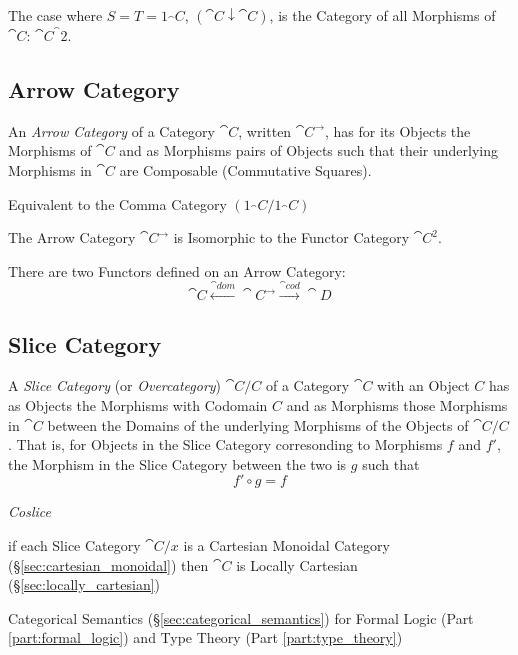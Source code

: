 The case where $S = T = 1_\cat{C}$, $(\cat{C} \downarrow
\cat{C})$, is the Category of all Morphisms of $\cat{C}$:
$\cat{C}^\cat{2}$.



\subsection{Arrow Category}\label{sec:arrow_category}

An \emph{Arrow Category} of a Category $\cat{C}$, written
$\cat{C^{\rightarrow}}$, has for its Objects the Morphisms of
$\cat{C}$ and as Morphisms pairs of Objects such that their
underlying Morphisms in $\cat{C}$ are Composable (Commutative
Squares).

Equivalent to the Comma Category $(1_\cat{C}/1_\cat{C})$

The Arrow Category $\cat{C}^\rightarrow$ is Isomorphic to the
Functor Category $\cat{C^2}$.

There are two Functors defined on an Arrow Category:
\[
  \cat{C} \xleftarrow{\cat{dom}} \cat{C}^\rightarrow
  \xrightarrow{\cat{cod}} \cat{D}
\]



\subsection{Slice Category}\label{sec:slice_category}

A \emph{Slice Category} (or \emph{Overcategory}) $\cat{C}/C$ of a Category
$\cat{C}$ with an Object $C$ has as Objects the Morphisms with Codomain $C$ and
as Morphisms those Morphisms in $\cat{C}$ between the Domains of the underlying
Morphisms of the Objects of $\cat{C}/C$. That is, for Objects in the Slice
Category corresonding to Morphisms $f$ and $f'$, the Morphism in the Slice
Category between the two is $g$ such that
\[
  f' \circ g = f
\]

\emph{Coslice}

if each Slice Category $\cat{C}/x$ is a Cartesian Monoidal Category
(\S\ref{sec:cartesian_monoidal}) then $\cat{C}$ is Locally Cartesian
(\S\ref{sec:locally_cartesian})

Categorical Semantics (\S\ref{sec:categorical_semantics}) for Formal
Logic (Part \ref{part:formal_logic}) and Type Theory (Part
\ref{part:type_theory})



